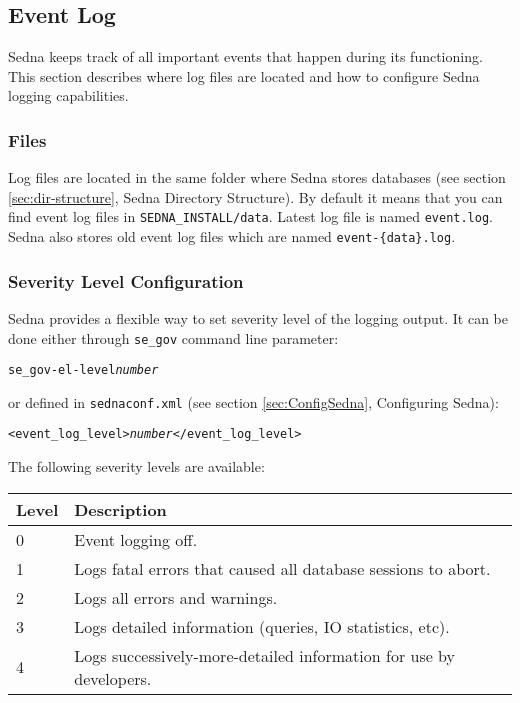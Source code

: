 \documentclass[a4paper,12pt]{article}
\begin{document}
\subsection{Event Log}
\label{sec:event-log}

Sedna keeps track of all important events that happen during its functioning.
This section describes where log files are located and how to configure Sedna
logging capabilities.

\subsubsection{Files}
Log files are located in the same folder where Sedna stores databases (see
section \ref{sec:dir-structure}, Sedna Directory Structure). By default it means
that you can find event log files in \verb!SEDNA_INSTALL/data!. Latest log file
is named \verb!event.log!. Sedna also stores old event log files which are named
\verb!event-{data}.log!.

\subsubsection{Severity Level Configuration}
Sedna provides a flexible way to set severity level of the logging output. It
can be done either through \verb!se_gov! command line parameter:

\begin{alltt}
se_gov -el-level \emph{number}
\end{alltt}

or defined in \verb!sednaconf.xml! (see section \ref{sec:ConfigSedna},
Configuring Sedna):

\begin{alltt}
<event_log_level>\emph{number}</event_log_level>
\end{alltt}

The following severity levels are available:
\\
\begin{tabular}{|l|l|}
\hline
\hline
Level    & Description                                                        \\
\hline
\hline
0        & Event logging off.                                                 \\
\hline
1        & Logs fatal errors that caused all database sessions to abort.      \\
\hline
2        & Logs all errors and warnings.                                      \\
\hline
3        & Logs detailed information (queries, IO statistics, etc).           \\
\hline
4        & Logs successively-more-detailed information for use by developers. \\
\hline
\end{tabular}
\end{document}
